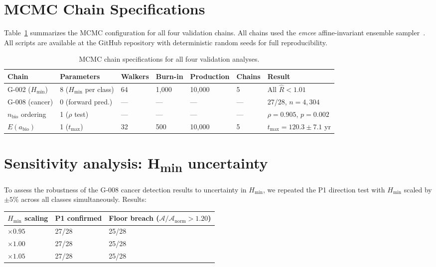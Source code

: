 \documentclass[12pt,a4paper]{article}
\newcommand{\Hmin}{H_{\min}}
\newcommand{\Ascore}{\mathcal{A}}
\begin{document}
\section{MCMC Chain Specifications}
\label{sec:supp_mcmc}

Table~\ref{tab:mcmc_spec} summarizes the MCMC configuration for all four
validation chains. All chains used the \textit{emcee} affine-invariant
ensemble sampler~\cite{ForemanMackey2013}. All scripts are available at the
GitHub repository with deterministic random seeds for full reproducibility.

\begin{table}[htb]
\centering
\caption{MCMC chain specifications for all four validation analyses.}
\label{tab:mcmc_spec}
\begin{tabular}{p{2.0cm}p{2.6cm}p{1.1cm}p{1.1cm}p{1.7cm}p{1.0cm}p{3.0cm}}
\toprule
\textbf{Chain} & \textbf{Parameters} & \textbf{Walkers} & \textbf{Burn-in} & \textbf{Production} & \textbf{Chains} & \textbf{Result} \\
\midrule
G-002 ($\Hmin$) & 8 ($\Hmin$ per class) & 64 & 1,000 & 10,000 & 5 & All $\hat{R} < 1.01$ \\[4pt]
G-008 (cancer) & 0 (forward pred.) & --- & --- & --- & --- & 27/28, $n=4{,}304$ \\[4pt]
$n_{\mathrm{bio}}$ ordering & 1 ($\rho$ test) & --- & --- & --- & --- & $\rho = 0.905$, $p = 0.002$ \\[4pt]
$E(a_{\mathrm{bio}})$ & 1 ($t_{\max}$) & 32 & 500 & 10,000 & 5 & $t_{\max} = 120.3 \pm 7.1$ yr \\
\bottomrule
\end{tabular}
\end{table}

\section{Sensitivity analysis: H\textsubscript{min} uncertainty}
\label{sec:supp_sensitivity}

To assess the robustness of the G-008 cancer detection results to uncertainty
in $\Hmin$, we repeated the P1 direction test with $\Hmin$ scaled by $\pm 5\%$
across all classes simultaneously. Results:

\begin{center}
\begin{tabular}{p{2.4cm}p{2.4cm}p{5.0cm}}
\toprule
$\Hmin$ scaling & P1 confirmed & Floor breach ($\Ascore/\Ascore_{\mathrm{norm}} > 1.20$) \\
\midrule
$\times 0.95$ & 27/28 & 25/28 \\
$\times 1.00$ & 27/28 & 25/28 \\
$\times 1.05$ & 27/28 & 25/28 \\
\bottomrule
\end{tabular}
\end{center}
\end{document}
